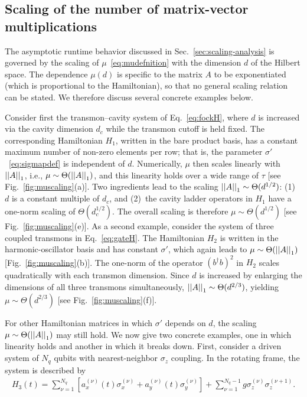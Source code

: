 \pagestyle{fancy}
\begin{appendices}


\thispagestyle{fancy}

\chapter{Scaling of the number of matrix-vector multiplications}
\label{app:muscaling}

The asymptotic runtime behavior discussed in Sec.~\ref{sec:scaling-analysis} is governed by the scaling of $\mu$~\eqref{eq:mudefnition} with the dimension $d$ of the Hilbert space. The dependence $\mu(d)$ is specific to the matrix $A$ to be exponentiated (which is proportional to the Hamiltonian), so that no general scaling relation can be stated. We therefore discuss several concrete examples below.

Consider first the transmon--cavity system of Eq.~\eqref{eq:fockH}, where $d$ is increased via the cavity dimension $d_c$ while the transmon cutoff is held fixed. The corresponding Hamiltonian $H_1$, written in the bare product basis, has a constant maximum number of non-zero elements per row; that is, the parameter $\sigma'$~\eqref{eq:sigmapdef} is independent of $d$. Numerically, $\mu$ then scales linearly with $\left|\left|A\right|\right|_1$, i.e., $\mu\sim\Theta(\left|\left|A\right|\right|_1)$, and this linearity holds over a wide range of $\tau$ [see Fig.~\ref{fig:muscaling}(a)]. Two ingredients lead to the scaling $\left|\left|A\right|\right|_1\sim \Theta(d^{1/2})$: (1)~$d$ is a constant multiple of $d_c$, and (2)~the cavity ladder operators in $H_1$ have a one-norm scaling of $\Theta(d_c^{1/2})$. The overall scaling is therefore $\mu\sim \Theta(d^{1/2})$ [see Fig.~\ref{fig:muscaling}(e)]. As a second example, consider the system of three coupled transmons in Eq.~\eqref{eq:gateH}. The Hamiltonian $H_2$ is written in the harmonic-oscillator basis and has constant $\sigma'$, which again leads to $\mu\sim\Theta(\left|\left|A\right|\right|_1)$ [Fig.~\ref{fig:muscaling}(b)]. The one-norm of the operator $(b^\dagger b)^2$ in $H_2$ scales quadratically with each transmon dimension. Since $d$ is increased by enlarging the dimensions of all three transmons simultaneously, $\left|\left|A\right|\right|_1\sim\Theta(d^{2/3})$, yielding $\mu\sim \Theta(d^{2/3})$ [see Fig.~\ref{fig:muscaling}(f)].

For other Hamiltonian matrices in which $\sigma'$ depends on $d$, the scaling $\mu\sim\Theta(\left|\left|A\right|\right|_1)$ may still hold. We now give two concrete examples, one in which linearity holds and another in which it breaks down. First, consider a driven system of $N_q$ qubits with nearest-neighbor $\sigma_z$ coupling. In the rotating frame, the system is described by
\begin{align}
\label{eq:H3}
 H_3(t)=\sum_{\nu=1}^{N_q}[a_x^{(\nu)}(t)\sigma^{(\nu)}_x+a_y^{(\nu)}(t)\sigma^{(\nu)}_y]+\sum_{\nu=1}^{N_q-1}g\sigma_z^{(\nu)}\sigma_z^{{(\nu+1)}}.
\end{align}


\end{appendices}
